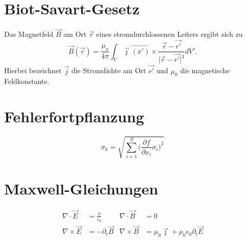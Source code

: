 \documentclass {scrartcl}
\newcommand{\be}{\begin{equation}} %
\newcommand{\ee}{\end{equation}} %
\begin{document}
\section{Biot-Savart-Gesetz}
Das Magnetfeld $\vec{B}$ am Ort $\vec{r}$
eines stromdurchlossenen Leiters ergibt sich zu
 \be
    \vec{B}
    (\vec{r})
    =
    \frac{\mu_o}{4\pi}
    \int_V
    \vec{\jmath}
    \vec{(x')}
    \times \frac{\vec{r}-\vec{r'}}{\lvert \vec{r} - \vec{r'}\rvert^3} dV'.
      \ee
  Hierbei bezeichnet $\vec{j}$ die Stromdichte am Ort $\vec{r'}$
  und ${\mu_0}$ die magnetische Feldkonstante.

  \section{Fehlerfortpflanzung}
  \begin{equation}
    \sigma_k =
    \sqrt{\sum_{i=1}^N
    \Biggl(\frac{\partial{f}}{\partial{x_i}} \sigma_i \Biggr)^2}
  \end{equation}
  \section{Maxwell-Gleichungen}

  \begin{align}
    \nabla\cdot\vec{E} &= \frac{\rho}{\epsilon_0}  &  \nabla\cdot\vec{B} &= 0 \\
    \nabla\times\vec{E} &= -\partial_t\vec{B} & \nabla\times\vec{B} &= \mu_0\vec{\jmath}
    +\mu_0\epsilon_0\partial_t\vec{E}
\end{align}
\end{document}
